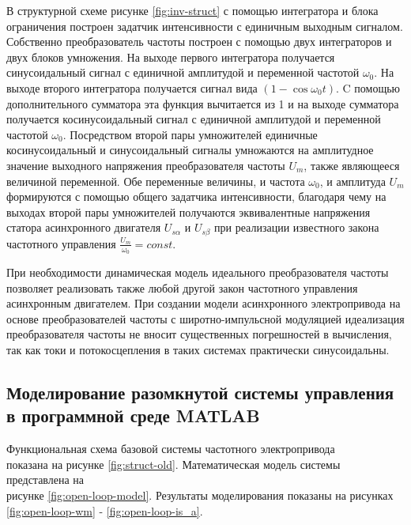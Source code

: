         В структурной схеме рисунке \ref{fig:inv-struct} с помощью интегратора
        и блока ограничения построен задатчик интенсивности с единичным
        выходным сигналом. Собственно преобразователь частоты построен с
        помощью двух интеграторов и двух блоков умножения. На выходе первого
        интегратора получается синусоидальный сигнал с единичной амплитудой и
        переменной частотой $\omega_0$. На выходе второго интегратора
        получается сигнал вида $(1-\cos \omega_0 t)$. C помощью дополнительного
        сумматора эта функция вычитается из 1 и на выходе сумматора получается
        косинусоидальный сигнал с единичной амплитудой и переменной частотой
        $\omega_0$. Посредством второй пары умножителей единичные
        косинусоидальный и синусоидальный сигналы умножаются на амплитудное
        значение выходного напряжения преобразователя частоты $U_m$, также
        являющееся величиной переменной. Обе переменные величины, и частота
        $\omega_0$, и амплитуда $U_m$ формируются с помощью общего задатчика
        интенсивности, благодаря чему на выходах второй пары умножителей
        получаются эквивалентные напряжения статора асинхронного двигателя
        $U_{s\alpha}$ и $U_{s\beta}$ при реализации известного закона
        частотного управления $\frac{U_m}{\omega_0} = const$. 

        При необходимости динамическая модель идеального преобразователя
        частоты позволяет реализовать также любой другой закон частотного
        управления асинхронным двигателем. При создании модели асинхронного
        электропривода на основе преобразователей частоты с широтно-импульсной
        модуляцией идеализация преобразователя частоты не вносит существенных
        погрешностей в вычисления, так как токи и потокосцепления в таких
        системах практически синусоидальны.

    \subsection{Моделирование разомкнутой системы управления в программной
        среде MATLAB}

        Функциональная схема базовой системы частотного электропривода\\ показана
        на рисунке \ref{fig:struct-old}. Математическая модель системы представлена на\\ 
        рисунке \ref{fig:open-loop-model}. Результаты моделирования показаны на рисунках
        \ref{fig:open-loop-wm} - \ref{fig:open-loop-is_a}.

